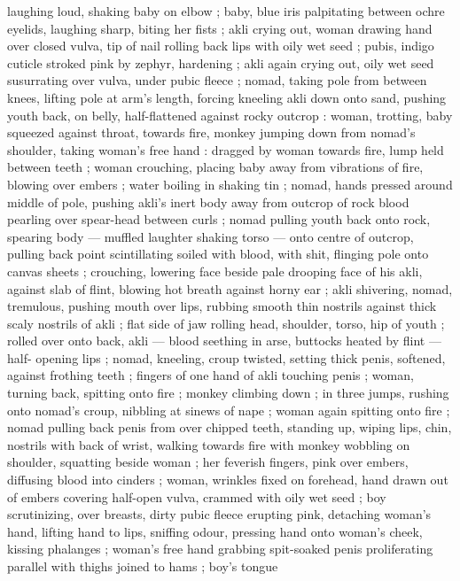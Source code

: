laughing loud, shaking baby on elbow ; baby, blue iris palpitating 
between ochre eyelids, laughing sharp, biting her fists ; akli crying 
out, woman drawing hand over closed vulva, tip of nail rolling back 
lips with oily wet seed ; pubis, indigo cuticle stroked pink by zephyr, 
hardening ; akli again crying out, oily wet seed susurrating over 
vulva, under pubic fleece ; nomad, taking pole from between knees, 
lifting pole at arm's length, forcing kneeling akli down onto sand, 
pushing youth back, on belly, half-flattened against rocky outcrop : 
woman, trotting, baby squeezed against throat, towards fire, monkey 
jumping down from nomad's shoulder, taking woman's free hand : 
dragged by woman towards fire, lump held between teeth ; woman 
crouching, placing baby away from vibrations of fire, blowing over 
embers ; water boiling in shaking tin ; nomad, hands pressed around 
middle of pole, pushing akli's inert body away from outcrop of rock 
{\col} blood pearling over spear-head between curls ; nomad pulling 
youth back onto rock, spearing body --- muffled laughter shaking 
torso --- onto centre of outcrop, pulling back point scintillating 
soiled with blood, with shit, flinging pole onto canvas sheets ; 
crouching, lowering face beside pale drooping face of his akli, 
against slab of flint, blowing hot breath against horny ear ; akli 
shivering, nomad, tremulous, pushing mouth over lips, rubbing 
smooth thin nostrils against thick scaly nostrils of akli ; flat side of 
jaw rolling head, shoulder, torso, hip of youth ; rolled over onto back, 
akli --- blood seething in arse, buttocks heated by flint --- half- 
opening lips ; nomad, kneeling, croup twisted, setting thick penis, 
softened, against frothing teeth ; fingers of one hand of akli 
touching penis ; woman, turning back, spitting onto fire ; monkey 
climbing down ; in three jumps, rushing onto nomad's croup, nibbling 
at sinews of nape ; woman again spitting onto fire ; nomad pulling 
back penis from over chipped teeth, standing up, wiping lips, chin, 
nostrils with back of wrist, walking towards fire with monkey wobbling 
on shoulder, squatting beside woman ; her feverish fingers, pink over 
embers, diffusing blood into cinders ; woman, wrinkles fixed on 
forehead, hand drawn out of embers covering half-open vulva, 
crammed with oily wet seed ; boy scrutinizing, over breasts, dirty 
pubic fleece erupting pink, detaching woman's hand, lifting hand to 
lips, sniffing odour, pressing hand onto woman's cheek, kissing 
phalanges ; woman's free hand grabbing spit-soaked penis 
proliferating parallel with thighs joined to hams ; boy's tongue 
